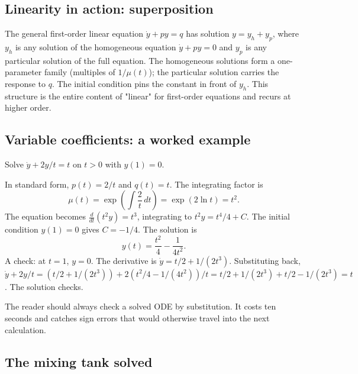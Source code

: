 \subsection{Linearity in action: superposition}

The general first-order linear equation $\dot{y} + p y = q$ has
solution $y = y_{h} + y_{p}$, where $y_{h}$ is any solution of the
homogeneous equation $\dot{y} + p y = 0$ and $y_{p}$ is any
particular solution of the full equation. The homogeneous solutions
form a one-parameter family (multiples of $1/\mu(t)$); the
particular solution carries the response to $q$. The
initial condition pins the constant in front of $y_{h}$. This
structure is the entire content of "linear" for first-order
equations and recurs at higher order.

\subsection{Variable coefficients: a worked example}

Solve $\dot{y} + 2 y / t = t$ on $t > 0$ with $y(1) = 0$.

In standard form, $p(t) = 2/t$ and $q(t) = t$. The integrating
factor is
\[
\mu(t) = \exp\!\left(\int \frac{2}{t}\,dt\right) = \exp(2 \ln t) = t^{2}.
\]
The equation becomes $\frac{d}{dt}(t^{2} y) = t^{3}$, integrating
to $t^{2} y = t^{4}/4 + C$. The initial condition $y(1) = 0$ gives
$C = -1/4$. The solution is
\[
y(t) = \frac{t^{2}}{4} - \frac{1}{4 t^{2}}.
\]
A check: at $t = 1$, $y = 0$. The derivative is $\dot{y} = t/2 +
1/(2 t^{3})$. Substituting back, $\dot{y} + 2 y/t = (t/2 + 1/(2
t^{3})) + 2(t^{2}/4 - 1/(4 t^{2}))/t = t/2 + 1/(2 t^{3}) + t/2 -
1/(2 t^{3}) = t$. The solution checks.

The reader should always check a solved ODE by substitution. It
costs ten seconds and catches sign errors that would otherwise
travel into the next calculation.

\subsection{The mixing tank solved}

